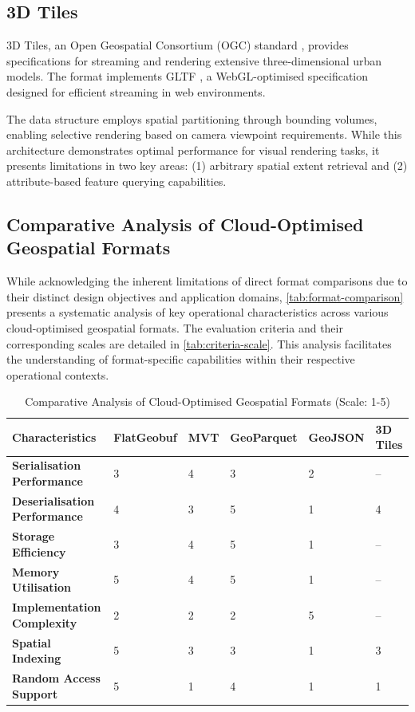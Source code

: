 \subsection{3D Tiles}
\label{rw:cloud_optimised_implementations:3d_tiles}
3D Tiles, an Open Geospatial Consortium (OGC) standard \citep{3d_tiles}, provides specifications for streaming and rendering extensive three-dimensional urban models. The format implements GLTF \citep{gltf}, a WebGL-optimised specification designed for efficient streaming in web environments.

The data structure employs spatial partitioning through bounding volumes, enabling selective rendering based on camera viewpoint requirements. While this architecture demonstrates optimal performance for visual rendering tasks, it presents limitations in two key areas: (1) arbitrary spatial extent retrieval and (2) attribute-based feature querying capabilities.

\subsection{Comparative Analysis of Cloud-Optimised Geospatial Formats}
\label{rw:cloud_optimised_implementations:comparison}
While acknowledging the inherent limitations of direct format comparisons due to their distinct design objectives and application domains, \autoref{tab:format-comparison} presents a systematic analysis of key operational characteristics across various cloud-optimised geospatial formats. The evaluation criteria and their corresponding scales are detailed in \autoref{tab:criteria-scale}. This analysis facilitates the understanding of format-specific capabilities within their respective operational contexts.

\begin{table}[htbp]
  \centering
  \caption{Comparative Analysis of Cloud-Optimised Geospatial Formats (Scale: 1-5)}
  \label{tab:format-comparison}
  \footnotesize
  \begin{tabular}{p{3cm}|p{1.8cm}|p{1.8cm}|p{1.8cm}|p{1.8cm}|p{1.8cm}}
    \hline
    \textbf{Characteristics} & \textbf{FlatGeobuf} & \textbf{MVT} & \textbf{GeoParquet} & \textbf{GeoJSON} & \textbf{3D Tiles} \\
    \hline
    \textbf{Serialisation Performance} & 3 & 4 & 3 & 2 & -- \\
    \hline
    \textbf{Deserialisation Performance} & 4 & 3 & 5 & 1 & 4\footnotemark[1] \\
    \hline
    \textbf{Storage Efficiency} & 3 & 4 & 5 & 1 & -- \\
    \hline
    \textbf{Memory Utilisation} & 5 & 4 & 5 & 1 & -- \\
    \hline
    \textbf{Implementation Complexity} & 2 & 2 & 2 & 5 & -- \\
    \hline
    \textbf{Spatial Indexing} & 5 & 3\footnotemark[2] & 3\footnotemark[3] & 1 & 3\footnotemark[4] \\
    \hline
    \textbf{Random Access Support} & 5 & 1 & 4 & 1 & 1 \\
    \hline
  \end{tabular}
\end{table}

